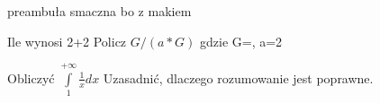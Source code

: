 preambuła
smaczna
bo z makiem

\begin{regex}
    Ile wynosi
    2+2
    Policz $G/(a*G)$ gdzie G=, a=2
\end{regex}

\begin{regex}
    Obliczyć
    $\int\limits_1^{+\infty} \frac{1}{x} dx$
    Uzasadnić, dlaczego rozumowanie jest poprawne.
\end{regex}